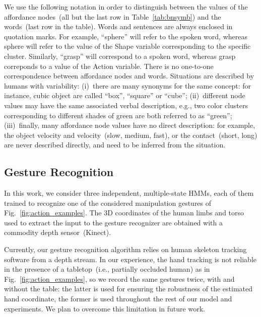 We use the following notation in order to distinguish between the values of the affordance nodes~(all but the last row in Table~\ref{tab:bnsymb}) and the words~(last row in the table).
Words and sentences are always enclosed in quotation marks.
For example, ``sphere'' will refer to the spoken word, whereas sphere will refer to the value of the Shape variable corresponding to the specific cluster.
Similarly, ``grasp'' will correspond to a spoken word, whereas grasp correponds to a value of the Action variable.
There is no one-to-one correspondence between affordance nodes and words.
Situations are described by humans with variability:
(i)~there are many synonyms for the same concept: for instance, cubic object are called ``box'', ``square'' or ``cube'';
(ii)~different node values may have the same associated verbal description, e.g., two color clusters corresponding to different shades of green are both referred to as ``green'';
(iii)~finally, many affordance node values have no direct description: for example, the object velocity and \objecthand{} velocity~(slow, medium, fast), or the \objecthand{} contact~(short, long) are never described directly, and need to be inferred from the situation.

\subsection{Gesture Recognition}
\label{sec:experimental_settings:gesture_recognition}
In this work, we consider three independent, multiple-state \aclp{HMM}, each of them trained to recognize one of the considered manipulation gestures of  Fig.~\ref{fig:action_examples}.
The 3D coordinates of the human limbs and torso used to extract the input to the gesture recognizer are obtained with a commodity depth sensor~(Kinect).

Currently, our gesture recognition algorithm relies on human skeleton tracking software from a depth stream.
In our experience, the hand tracking is not reliable in the presence of a tabletop~(i.e., partially occluded human) as in Fig.~\ref{fig:action_examples}, so we record the same gestures twice, with and without the table: the latter is used for ensuring the robustness of the estimated hand coordinate, the former is used throughout the rest of our model and experiments.
We plan to overcome this limitation in future work. %
